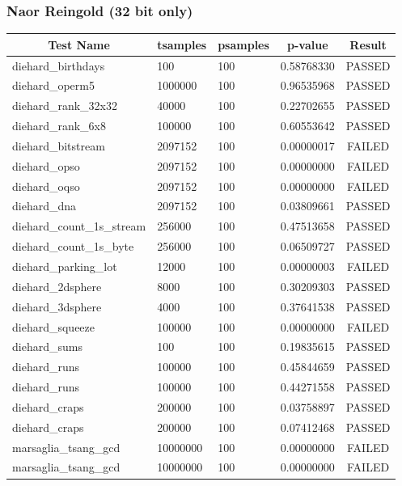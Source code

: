 \documentclass[titlepage, 11pt]{article}
\begin{document}
\subsubsection{Naor Reingold (32 bit only)}
\begin{table}[!htb]
\begin{tabular}{l|l|l|c|c}
\hline
\multicolumn{1}{c|}{\textbf{Test Name}} & \multicolumn{1}{c|}{\textbf{tsamples}} & \multicolumn{1}{c|}{\textbf{psamples}} & \textbf{p-value} & \textbf{Result} \\ \hline
diehard\_birthdays & 100 & 100 & 0.58768330 & PASSED \\
diehard\_operm5 & 1000000 & 100 & 0.96535968 & PASSED \\
diehard\_rank\_32x32 & 40000 & 100 & 0.22702655 & PASSED \\
diehard\_rank\_6x8 & 100000 & 100 & 0.60553642 & PASSED \\
diehard\_bitstream & 2097152 & 100 & 0.00000017 & FAILED \\
diehard\_opso & 2097152 & 100 & 0.00000000 & FAILED \\
diehard\_oqso & 2097152 & 100 & 0.00000000 & FAILED \\
diehard\_dna & 2097152 & 100 & 0.03809661 & PASSED \\
diehard\_count\_1s\_stream & 256000 & 100 & 0.47513658 & PASSED \\
diehard\_count\_1s\_byte & 256000 & 100 & 0.06509727 & PASSED \\
diehard\_parking\_lot & 12000 & 100 & 0.00000003 & FAILED \\
diehard\_2dsphere & 8000 & 100 & 0.30209303 & PASSED \\
diehard\_3dsphere & 4000 & 100 & 0.37641538 & PASSED \\
diehard\_squeeze & 100000 & 100 & 0.00000000 & FAILED \\
diehard\_sums & 100 & 100 & 0.19835615 & PASSED \\
diehard\_runs & 100000 & 100 & 0.45844659 & PASSED \\
diehard\_runs & 100000 & 100 & 0.44271558 & PASSED \\
diehard\_craps & 200000 & 100 & 0.03758897 & PASSED \\
diehard\_craps & 200000 & 100 & 0.07412468 & PASSED \\
marsaglia\_tsang\_gcd & 10000000 & 100 & 0.00000000 & FAILED \\
marsaglia\_tsang\_gcd & 10000000 & 100 & 0.00000000 & FAILED \\

\end{tabular}
\end{table}
\end{document}
